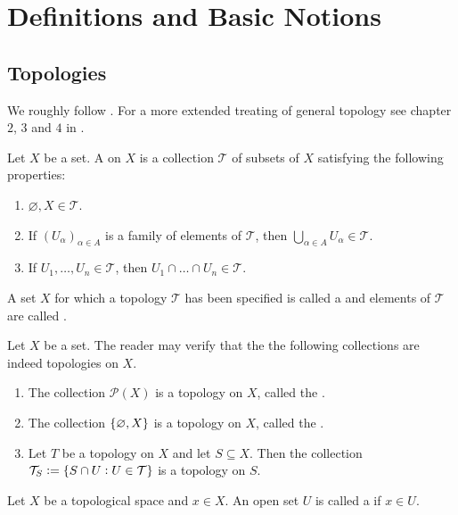 \section{Definitions and Basic Notions}
\subsection{Topologies}
We roughly follow \cite[19 -- 38]{lee:topological_manifolds:2011}. For a more extended treating of general topology see chapter $2$, $3$ and $4$ in \cite{munkres:topology:2000}.

\begin{definition}
	Let $X$ be a set. A  on $X$ is a collection $\mathcal{T}$ of subsets of $X$ satisfying the following properties:
	\begin{enumerate}
		\item $\varnothing, X \in \mathcal{T}$.
		\item If $(U_\alpha)_{\alpha \in A}$ is a family of elements of $\mathcal{T}$, then $\bigcup_{\alpha \in A} U_\alpha \in \mathcal{T}$.
		\item If $U_1,\dots,U_n \in \mathcal{T}$, then $U_1 \cap \dots \cap U_n \in \mathcal{T}$.
	\end{enumerate}

	A set $X$ for which a topology $\mathcal{T}$ has been specified is called a  and elements of $\mathcal{T}$ are called . 
\end{definition}

\begin{example}[Topologies]
	Let $X$ be a set. The reader may verify that the the following collections are indeed topologies on $X$.
	\begin{enumerate}[label = \textup{(}\alph*\textup{)}]
		\item The collection $\mathcal{P}(X)$ is a topology on $X$, called the .			
		\item The collection $\cbr[0]{\varnothing,X}$ is a topology on $X$, called the .
		\item Let $T$ be a topology on $X$ and let $S \subseteq X$. Then the collection $\mathcal{T}_S := \cbr[0]{S \cap U : U \in \mathcal{T}}$ is a topology on $S$.
	\end{enumerate}
\end{example}

\begin{definition}
	Let $X$ be a topological space and $x \in X$. An open set $U$ is called a  if $x \in U$.
\end{definition}

